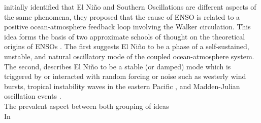 \documentclass[12pt, onecolumn]{revtex4}    %
\begin{document}
\cite{doi:10.1175/1520-04931969097} initially identified that El Ni\~{n}o and Southern Oscillations are different aspects of the same phenomena, they proposed that the cause of ENSO is related to a positive ocean-atmosphere feedback loop involving the Walker circulation. This idea forms the basis of two approximate schools of thought on the theoretical origins of ENSOs \citep{wang2017nino}. The first suggests El Ni\~{n}o to be a phase of a self-sustained, unstable, and natural oscillatory mode of the coupled ocean-atmosphere system. The second, describes El Ni\~{n}o to be a stable (or damped) mode which is triggered by or interacted with random forcing or noise such as westerly wind bursts, tropical instability waves in the eastern Pacific \citep{An:2008aa}, and Madden-Julian oscillation events \citep{doi:10.1175/JAS4029.1}. \\

The prevalent aspect between both grouping of ideas \\


In \\





\newpage

\nocite{ruddiman_climate}


\end{document}
